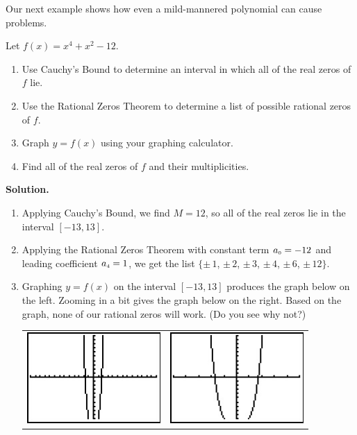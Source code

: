 Our next example shows how even a mild-mannered polynomial can cause problems.

\begin{ex}  Let $f(x) = x^4 + x^2 - 12$.

\begin{enumerate}

\item  Use Cauchy's Bound to determine an interval in which all of the real zeros of $f$ lie.

\item  Use the Rational Zeros Theorem to determine a list of possible rational zeros of $f$.

\item  Graph $y=f(x)$ using your graphing calculator.

\item  Find all of the real zeros of $f$ and their multiplicities.


\end{enumerate}

{\bf Solution.}

\begin{enumerate}

\item  Applying Cauchy's Bound, we find $M = 12$, so all of the real zeros lie in the interval $[-13,13]$.

\item  Applying the Rational Zeros Theorem with constant term $a_{\mbox{\tiny$0$}} = -12$ and leading coefficient $a_{\mbox{\tiny$4$}} = 1$, we get the list $\{\pm \, 1$, $\pm \, 2$, $\pm \, 3$, $\pm \, 4$, $\pm \, 6$, $\pm \, 12\}$.

\item  Graphing $y=f(x)$ on the interval $[-13,13]$ produces the graph below on the left.  Zooming in a bit gives the graph below on the right.  Based on the graph, none of our rational zeros will work. (Do you see why not?)


\begin{center}

\begin{tabular}{cc}

\includegraphics[width=2in]{./PolynomialsGraphics/RealZero05.jpg} \hspace{0.75in} & \includegraphics[width=2in]{./PolynomialsGraphics/RealZero06.jpg}


\end{tabular}
\end{center}
\end{enumerate}
\end{ex}
